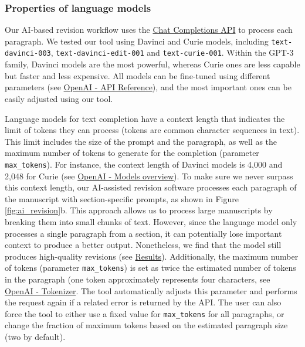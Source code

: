 \documentclass[
]{article}
\begin{document}
\hypertarget{properties-of-language-models}{%
\subsubsection{Properties of language models}\label{properties-of-language-models}}

Our AI-based revision workflow uses the \href{https://platform.openai.com/docs/guides/text-generation/chat-completions-api}{Chat Completions API} to process each paragraph.
We tested our tool using Davinci and Curie models, including \texttt{text-davinci-003}, \texttt{text-davinci-edit-001} and \texttt{text-curie-001}.
Within the GPT-3 family, Davinci models are the most powerful, whereas Curie ones are less capable but faster and less expensive.
All models can be fine-tuned using different parameters (see \href{https://platform.openai.com/docs/api-reference/chat/create}{OpenAI - API Reference}), and the most important ones can be easily adjusted using our tool.

Language models for text completion have a context length that indicates the limit of tokens they can process (tokens are common character sequences in text).
This limit includes the size of the prompt and the paragraph, as well as the maximum number of tokens to generate for the completion (parameter \texttt{max\_tokens}).
For instance, the context length of Davinci models is 4,000 and 2,048 for Curie (see \href{https://platform.openai.com/docs/models/gpt-3}{OpenAI - Models overview}).
To make sure we never surpass this context length, our AI-assisted revision software processes each paragraph of the manuscript with section-specific prompts, as shown in Figure \ref{fig:ai_revision}b.
This approach allows us to process large manuscripts by breaking them into small chunks of text.
However, since the language model only processes a single paragraph from a section, it can potentially lose important context to produce a better output.
Nonetheless, we find that the model still produces high-quality revisions (see \protect\hyperlink{sec:results}{Results}).
Additionally, the maximum number of tokens (parameter \texttt{max\_tokens}) is set as twice the estimated number of tokens in the paragraph (one token approximately represents four characters, see \href{https://platform.openai.com/tokenizer\%5D}{OpenAI - Tokenizer}.
The tool automatically adjusts this parameter and performs the request again if a related error is returned by the API.
The user can also force the tool to either use a fixed value for \texttt{max\_tokens} for all paragraphs, or change the fraction of maximum tokens based on the estimated paragraph size (two by default).
\end{document}
